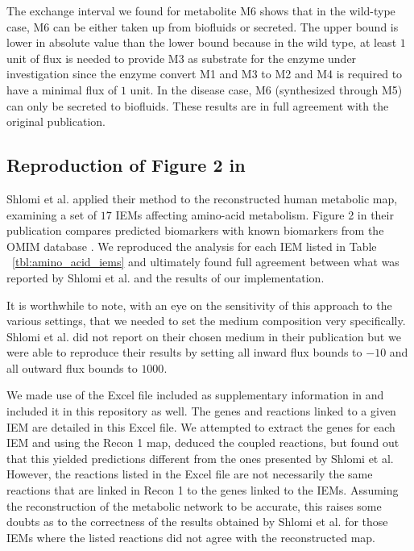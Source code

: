 \documentclass[10pt,a4paper,onecolumn]{article}
\begin{document}
The exchange interval we found for metabolite M6 shows that in the
wild-type case, M6 can be either taken up from biofluids or secreted.
The upper bound is lower in absolute value than the lower bound because
in the wild type, at least \(1\) unit of flux is needed to provide M3 as
substrate for the enzyme under investigation since the enzyme convert M1
and M3 to M2 and M4 is required to have a minimal flux of \(1\) unit. In
the disease case, M6 (synthesized through M5) can only be secreted to
biofluids. These results are in full agreement with the original
publication.

\subsection{\texorpdfstring{Reproduction of Figure 2 in
\autocite{Shlomi2009}}{Reproduction of Figure 2 in {[}@Shlomi2009{]}}}\label{reproduction-of-figure-2-in-shlomi2009}

Shlomi et al. applied their method to the reconstructed human metabolic
map, examining a set of \(17\) IEMs affecting amino-acid metabolism.
Figure 2 in their publication compares predicted biomarkers with known
biomarkers from the OMIM database \autocite{McKusick2007}. We reproduced
the analysis for each IEM listed in Table ~\ref{tbl:amino_acid_iems} and
ultimately found full agreement between what was reported by Shlomi et
al. and the results of our implementation.

It is worthwhile to note, with an eye on the sensitivity of this
approach to the various settings, that we needed to set the medium
composition very specifically. Shlomi et al. did not report on their
chosen medium in their publication but we were able to reproduce their
results by setting all inward flux bounds to \(-10\) and all outward
flux bounds to \(1000\).

We made use of the Excel file included as supplementary information in
\autocite{Shlomi2009} and included it in this repository as well. The
genes and reactions linked to a given IEM are detailed in this Excel
file. We attempted to extract the genes for each IEM and using the Recon
1 map, deduced the coupled reactions, but found out that this yielded
predictions different from the ones presented by Shlomi et al. However,
the reactions listed in the Excel file are not necessarily the same
reactions that are linked in Recon 1 to the genes linked to the IEMs.
Assuming the reconstruction of the metabolic network to be accurate,
this raises some doubts as to the correctness of the results obtained by
Shlomi et al. for those IEMs where the listed reactions did not agree
with the reconstructed map.
\end{document}
